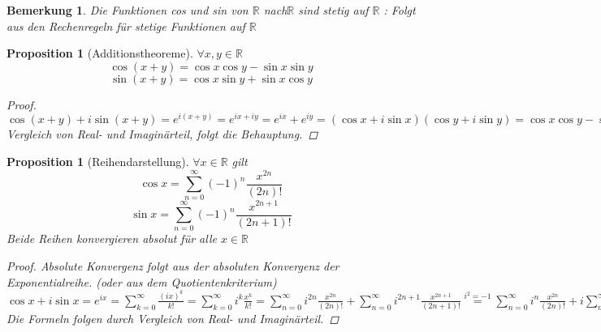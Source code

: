 \documentclass[a4paper,titlepage,oneside]{article}
\def\R{\ensuremath{\mathbb{R}} }
\def\im{\ensuremath{\mathit{i}} }
\def\e{\ensuremath{\mathit{e}} }
\newcommand{\suminf}[2][n]{\ensuremath{\sum_{#1= 0}^{\infty}{#2}}}
\theoremstyle{thmstyle}
\newtheorem{prop}[satz]{Proposition}
\newtheorem{bem}[satz]{Bemerkung}
\begin{document}
\begin{bem}
Die Funktionen cos und sin von \R nach\R sind stetig auf \R:
Folgt aus den Rechenregeln für stetige Funktionen auf \R
\end{bem}

\begin{prop}[Additionstheoreme]
$\forall x,y \in \R$
\[ \cos (x + y) = \cos x \cos y - \sin x \sin y\]
\[ \sin (x + y) = \cos x \sin y + \sin x \cos y \]
\begin{proof}
$\cos (x + y) + \im \sin (x + y) = \e^{\im(x+y)} = \e^{\im x + \im y} = \e^{\im x} + \e^{\im y} = (\cos x + \im \sin x) (\cos y + \im \sin y) = \cos x \cos y - \sin x \sin y + \im(\cos x \sin y + \sin x \cos y) $ Vergleich von Real- und Imaginärteil, folgt die Behauptung.
\end{proof}
\end{prop}

\begin{prop}[Reihendarstellung]
$\forall x \in \R $ gilt
\[\cos x = \suminf{(-1)^n \frac{x^{2n}}{(2n)!}}\]
\[\sin x = \suminf{(-1)^n \frac{x^{2n+1}}{(2n+1)!}}\]
Beide Reihen konvergieren absolut für alle $ x \in \R$
\begin{proof}
Absolute Konvergenz folgt aus der absoluten Konvergenz der Exponentialreihe. (oder aus dem Quotientenkriterium)\\
$\cos x + \im \sin x = \e^{\im x} = \suminf[k]{\frac{(\im x)^k}{k!}} = \suminf[k]{\im^k\frac{x^k}{k!}} = \suminf{\im^{2n} \frac{x^{2n}}{(2n)!}} + \suminf{\im^{2n+1} \frac{x^{2n+1}}{(2n+1)!}}  \overset{\im^2 = -1}{=} \suminf{\im^{n} \frac{x^{2n}}{(2n)!}} + \im \suminf{\im^{n} \frac{x^{2n+1}}{(2n+1)!}}$\\
Die Formeln folgen durch Vergleich von Real- und Imaginärteil.
\end{proof}
\end{prop}
\end{document}
